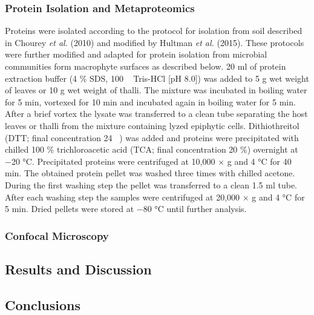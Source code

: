 \documentclass[12pt,]{article}
\begin{document}
\hypertarget{protein-isolation-and-metaproteomics}{%
\subsubsection{Protein Isolation and
Metaproteomics}\label{protein-isolation-and-metaproteomics}}

Proteins were isolated according to the protocol for isolation from soil
described in Chourey \emph{et al.} (2010) and modified by Hultman
\emph{et al.} (2015). These protocols were further modified and adapted
for protein isolation from microbial communities form macrophyte
surfaces as described below. 20 \si{\ml} of protein extraction buffer (4
\si{\percent} SDS, 100 \si{\milli\Molar} Tris-HCl {[}pH 8.0{]}) was
added to 5 \si{\g} wet weight of leaves or 10 \si{\g} wet weight of
thalli. The mixture was incubated in boiling water for 5 \si{\minute},
vortexed for 10 \si{\minute} and incubated again in boiling water for 5
\si{\minute}. After a brief vortex the lysate was transferred to a clean
tube separating the host leaves or thalli from the mixture containing
lyzed epiphytic cells. Dithiothreitol (DTT; final concentration 24
\si{\milli\Molar}) was added and proteins were precipitated with chilled
100 \si{\percent} trichloroacetic acid (TCA; final concentration 20
\si{\percent}) overnight at \num{-20} °C. Precipitated proteins were
centrifuged at 10,000 × g and 4 \si{\degreeCelsius} for 40 \si{\minute}.
The obtained protein pellet was washed three times with chilled acetone.
During the first washing step the pellet was transferred to a clean 1.5
\si{\ml} tube. After each washing step the samples were centrifuged at
20,000 × g and 4 \si{\degreeCelsius} for 5 \si{\minute}. Dried pellets
were stored at \num{-80} °C until further analysis.

\hypertarget{confocal-microscopy}{%
\subsubsection{Confocal Microscopy}\label{confocal-microscopy}}

\hypertarget{results-and-discussion}{%
\subsection{Results and Discussion}\label{results-and-discussion}}

\hypertarget{conclusions}{%
\subsection{Conclusions}\label{conclusions}}
\end{document}
